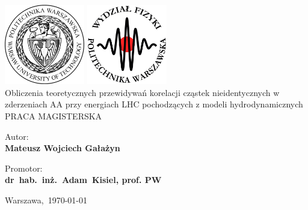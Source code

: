\documentclass[11pt,a4paper,openright]{report}
\begin{document}
\begin{titlepage}
	\includegraphics[height=3.5cm]{wut}
	    \hfill
	\includegraphics[height=3.5cm]{wut_physics}
	\center
	{\textbf{}}\\[2cm]
	{ \Huge Obliczenia teoretycznych przewidywań korelacji cząstek nieidentycznych w zderzeniach AA przy energiach LHC pochodzących z modeli hydrodynamicznych }
	\\[3.2cm]


	\LARGE\uppercase{Praca magisterska}\\[1.3cm]
		\begin{flushright} \Large
		Autor:\hspace{2.2cm}~\\
		\textbf{Mateusz Wojciech Gałażyn}\\[-0.5cm]
		\end{flushright}

		\begin{flushright} \Large
		Promotor:\hspace{1.8cm}~\\
		\textbf{dr~hab.~inż.~Adam~{Kisiel}, prof. PW}\\[0cm]
		\end{flushright}

	{\large Warszawa,~\mydatePL\today}
	\vfill
\end{titlepage}
\cleardoublepage
{}
\linenumbers

\begin{abstract}

\end{abstract}
\cleardoublepage
\renewcommand{\abstractname}{Streszczenie}
\begin{abstract}

\end{abstract}
\cleardoublepage
\pagestyle{empty}
\tableofcontents
\cleardoublepage
\pagestyle{headings}


\newpage

\newpage

\newpage

\newpage

\newpage

\newpage



\listoffigures
%
\end{document}
